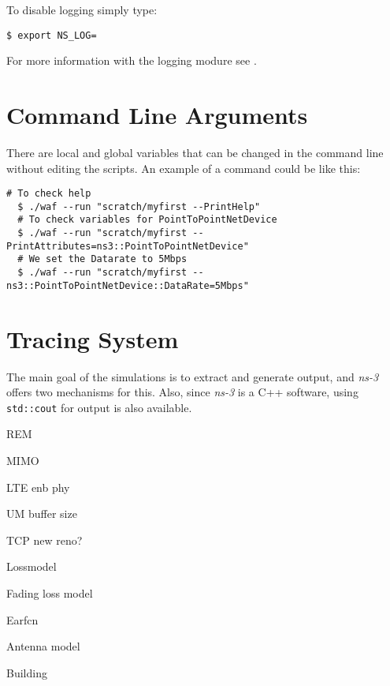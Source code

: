 To disable logging simply type:

\begin{lstlisting}[escapechar=@, language=myshell,caption={Disabling logging in ns-3}, captionpos=b]
  $ export NS_LOG=
\end{lstlisting}

For more information with the logging modure see \cite{ns3}.

\section{Command Line Arguments}
There are local and global variables that can be changed in the command line without
editing the scripts. An example of a command could be like this:

\begin{lstlisting}[escapechar=@, language=myshell,caption={Command line arguments}, captionpos=b]
  # To check help 
  $ ./waf --run "scratch/myfirst --PrintHelp"
  # To check variables for PointToPointNetDevice
  $ ./waf --run "scratch/myfirst --PrintAttributes=ns3::PointToPointNetDevice"
  # We set the Datarate to 5Mbps
  $ ./waf --run "scratch/myfirst --ns3::PointToPointNetDevice::DataRate=5Mbps"
\end{lstlisting}

\section{Tracing System}
The main goal of the simulations is to extract and generate output, and \textit{ns-3} offers two
mechanisms for this. Also, since \textit{ns-3} is a C++ software, using \texttt{std::cout} for
output is also available.

REM

MIMO

LTE enb phy

UM buffer size

TCP new reno?

Lossmodel

Fading loss model

Earfcn

Antenna model

Building